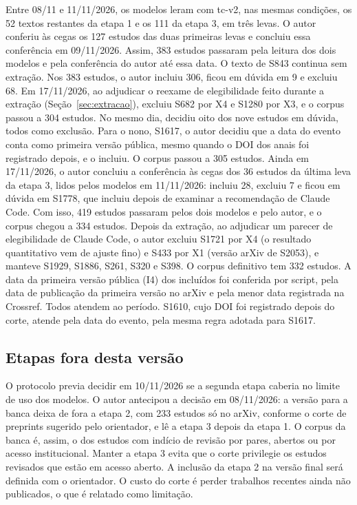 Entre 08/11 e 11/11/2026, os modelos leram com tc-v2, nas mesmas condições, os 52 textos restantes da etapa 1 e
os 111 da etapa 3, em três levas. O autor conferiu às cegas os 127 estudos das duas primeiras levas e concluiu essa
conferência em 09/11/2026. Assim, 383 estudos passaram pela leitura dos dois modelos e pela conferência do autor até essa data. O texto de S843 continua sem extração. Nos 383 estudos, o autor incluiu 306, ficou
em dúvida em 9 e excluiu 68. Em 17/11/2026, ao adjudicar o reexame de elegibilidade feito durante a extração
(Seção~\ref{sec:extracao}), excluiu S682 por X4 e S1280 por X3, e o corpus passou a 304 estudos. No mesmo dia, decidiu oito dos
nove estudos em dúvida, todos como exclusão. Para o nono, S1617, o autor decidiu que a data do evento conta
como primeira versão pública, mesmo quando o DOI dos anais foi registrado depois, e o incluiu. O corpus passou
a 305 estudos. Ainda em 17/11/2026, o autor concluiu a conferência às cegas dos 36 estudos da última leva da
etapa 3, lidos pelos modelos em 11/11/2026: incluiu 28, excluiu 7 e ficou em dúvida em S1778, que incluiu depois
de examinar a recomendação de Claude Code. Com isso, 419 estudos passaram pelos dois modelos e pelo autor, e o
corpus chegou a 334 estudos. Depois da extração, ao adjudicar um parecer de elegibilidade de Claude Code, o autor
excluiu S1721 por X4 (o resultado quantitativo vem de ajuste fino) e S433 por X1 (versão arXiv de S2053), e manteve
S1929, S1886, S261, S320 e S398. O corpus definitivo tem 332 estudos. A data da
primeira versão pública (I4) dos incluídos foi conferida por script, pela data de publicação da primeira versão
no arXiv e pela menor data registrada na Crossref. Todos atendem ao período. S1610, cujo DOI foi registrado depois do
corte, atende pela data do evento, pela mesma regra adotada para S1617.

\subsection{Etapas fora desta versão}
O protocolo previa decidir em 10/11/2026 se a segunda etapa caberia no limite de uso dos modelos. O autor antecipou
a decisão em 08/11/2026: a versão para a banca deixa de fora a etapa 2, com 233 estudos só no arXiv, conforme o
corte de preprints sugerido pelo orientador, e lê a etapa 3 depois da etapa 1. O corpus da banca é, assim, o dos
estudos com indício de revisão por pares, abertos ou por acesso institucional. Manter a etapa 3 evita que o corte
privilegie os estudos revisados que estão em acesso aberto. A inclusão da etapa 2 na versão final será definida
com o orientador. O custo do corte é perder trabalhos recentes ainda não publicados, o que é relatado como
limitação.


